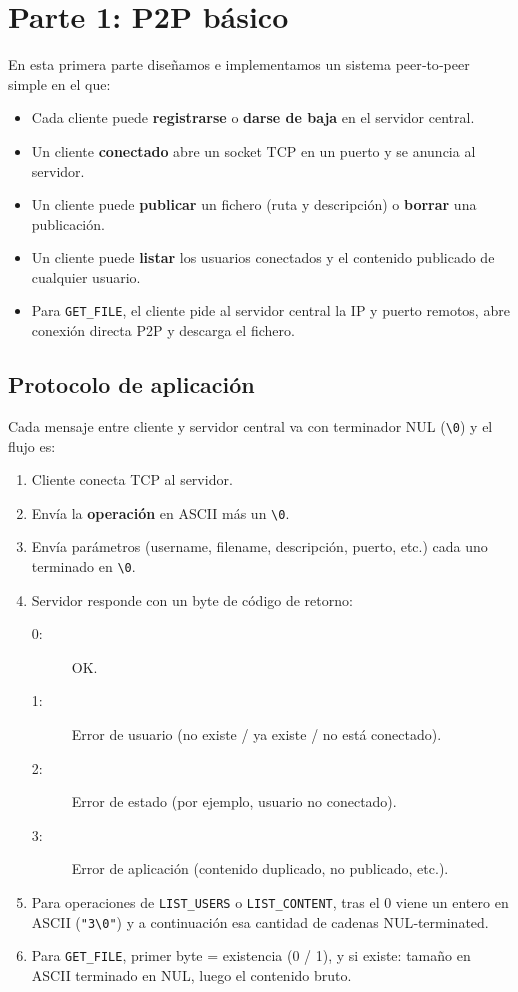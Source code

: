 \documentclass[12pt,a4paper]{article}
\begin{document}
\section{Parte 1: P2P básico}

En esta primera parte diseñamos e implementamos un sistema peer‐to‐peer simple en el que:

\begin{itemize}
  \item Cada cliente puede \textbf{registrarse} o \textbf{darse de baja} en el servidor central.
  \item Un cliente \textbf{conectado} abre un socket TCP en un puerto y se anuncia al servidor.
  \item Un cliente puede \textbf{publicar} un fichero (ruta y descripción) o \textbf{borrar} una publicación.
  \item Un cliente puede \textbf{listar} los usuarios conectados y el contenido publicado de cualquier usuario.
  \item Para \texttt{GET\_FILE}, el cliente pide al servidor central la IP y puerto remotos, abre conexión directa P2P y descarga el fichero.
\end{itemize}

\subsection{Protocolo de aplicación}

Cada mensaje entre cliente y servidor central va con terminador NUL (\texttt{\textbackslash0}) y el flujo es:

\begin{enumerate}
  \item Cliente conecta TCP al servidor.
  \item Envía la \textbf{operación} en ASCII más un \texttt{\textbackslash0}.
  \item Envía parámetros (username, filename, descripción, puerto, etc.) cada uno terminado en \texttt{\textbackslash0}.
  \item Servidor responde con un byte de código de retorno:
    \begin{description}
      \item[0:] OK.
      \item[1:] Error de usuario (no existe / ya existe / no está conectado).
      \item[2:] Error de estado (por ejemplo, usuario no conectado).
      \item[3:] Error de aplicación (contenido duplicado, no publicado, etc.).
    \end{description}
  \item Para operaciones de \texttt{LIST\_USERS} o \texttt{LIST\_CONTENT}, tras el 0 viene un entero en ASCII (\texttt{"3\textbackslash0"}) y a continuación esa cantidad de cadenas NUL‐terminated.
  \item Para \texttt{GET\_FILE}, primer byte = existencia (0 / 1), y si existe: tamaño en ASCII terminado en NUL, luego el contenido bruto.
\end{enumerate}
\end{document}
